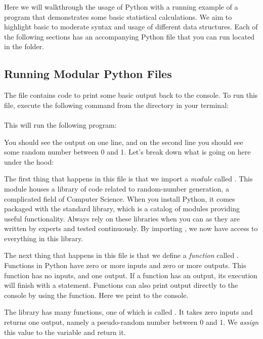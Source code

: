 Here we will walkthrough the usage of Python with a running example of a program that demonstrates some basic statistical calculations. We aim to highlight basic to moderate syntax and usage of different data structures.
Each of the following sections has an accompanying Python file that you can run located in the  folder.

\subsection{Running Modular Python Files}

The file  contains code to print some basic output back to the console.
To run this file, execute the following command from the  directory in your terminal:\\
\\
This will run the following program:


You should see the output  on one line, and on the second line you should see some random number between 0 and 1.
Let's break down what is going on here under the hood:

The first thing that happens in this file is that we import a \textit{module} called . This module houses a library of code related to random-number generation, a complicated field of Computer Science.
When you install Python, it comes packaged with the standard library, which is a catalog of modules providing useful functionality. Always rely on these libraries when you can as they are written by experts and tested continuously.
By importing , we now have access to everything in this library.

The next thing that happens in this file is that we define a \textit{function} called . Functions in Python have zero or more inputs and zero or more outputs. This function has no inputs, and one output.
If a function has an output, its execution will finish with a  statement.
Functions can also print output directly to the console by using the  function.
Here we print  to the console.

The  library has many functions, one of which is called .
It takes zero inputs and returns one output, namely a pseudo-random number between 0 and 1.
We \textit{assign} this value to the variable  and return it.


